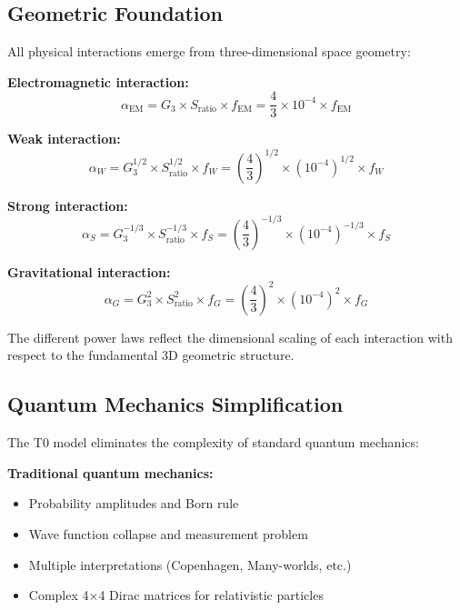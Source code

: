 \documentclass[12pt,a4paper]{report}
\begin{document}
\subsection{Geometric Foundation}
\label{subsec:geometric_foundation}

All physical interactions emerge from three-dimensional space geometry:

\textbf{Electromagnetic interaction:}
\begin{equation}
	\alpha_{\text{EM}} = G_3 \times S_{\text{ratio}} \times f_{\text{EM}} = \frac{4}{3} \times 10^{-4} \times f_{\text{EM}}
\end{equation}

\textbf{Weak interaction:}
\begin{equation}
	\alpha_W = G_3^{1/2} \times S_{\text{ratio}}^{1/2} \times f_W = \left(\frac{4}{3}\right)^{1/2} \times (10^{-4})^{1/2} \times f_W
\end{equation}

\textbf{Strong interaction:}
\begin{equation}
	\alpha_S = G_3^{-1/3} \times S_{\text{ratio}}^{-1/3} \times f_S = \left(\frac{4}{3}\right)^{-1/3} \times (10^{-4})^{-1/3} \times f_S
\end{equation}

\textbf{Gravitational interaction:}
\begin{equation}
	\alpha_G = G_3^2 \times S_{\text{ratio}}^2 \times f_G = \left(\frac{4}{3}\right)^2 \times (10^{-4})^2 \times f_G
\end{equation}

The different power laws reflect the dimensional scaling of each interaction with respect to the fundamental 3D geometric structure.

\subsection{Quantum Mechanics Simplification}
\label{subsec:quantum_mechanics_simplification}

The T0 model eliminates the complexity of standard quantum mechanics:

\textbf{Traditional quantum mechanics:}
\begin{itemize}
	\item Probability amplitudes and Born rule
	\item Wave function collapse and measurement problem
	\item Multiple interpretations (Copenhagen, Many-worlds, etc.)
	\item Complex 4×4 Dirac matrices for relativistic particles
\end{itemize}
\end{document}
